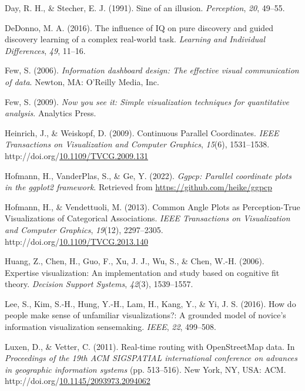 \documentclass[print]{nuthesis}
\newlength{\cslhangindent}
\newenvironment{CSLReferences}[2]%
{\setlength{\parindent}{0pt}%
\everypar{\setlength{\hangindent}{\cslhangindent}}\ignorespaces}%
{\par}
\begin{document}
\begin{CSLReferences}{1}{0}
\leavevmode{}%
Day, R. H., \& Stecher, E. J. (1991). Sine of an illusion. \emph{Perception}, \emph{20}, 49--55.

\leavevmode{}%
DeDonno, M. A. (2016). The influence of IQ on pure discovery and guided discovery learning of a complex real-world task. \emph{Learning and Individual Differences}, \emph{49}, 11--16.

\leavevmode{}%
Few, S. (2006). \emph{Information dashboard design: The effective visual communication of data}. Newton, MA: O'Reilly Media, Inc.

\leavevmode{}%
Few, S. (2009). \emph{Now you see it: Simple visualization techniques for quantitative analysis}. Analytics Press.

\leavevmode{}%
Heinrich, J., \& Weiskopf, D. (2009). {Continuous Parallel Coordinates}. \emph{IEEE Transactions on Visualization and Computer Graphics}, \emph{15}(6), 1531--1538. http://doi.org/\href{https://doi.org/10.1109/TVCG.2009.131}{10.1109/TVCG.2009.131}

\leavevmode{}%
Hofmann, H., VanderPlas, S., \& Ge, Y. (2022). \emph{Ggpcp: Parallel coordinate plots in the ggplot2 framework}. Retrieved from \url{https://github.com/heike/ggpcp}

\leavevmode{}%
Hofmann, H., \& Vendettuoli, M. (2013). {Common Angle Plots as Perception-True Visualizations of Categorical Associations}. \emph{IEEE Transactions on Visualization and Computer Graphics}, \emph{19}(12), 2297--2305. http://doi.org/\href{https://doi.org/10.1109/TVCG.2013.140}{10.1109/TVCG.2013.140}

\leavevmode{}%
Huang, Z., Chen, H., Guo, F., Xu, J. J., Wu, S., \& Chen, W.-H. (2006). Expertise visualization: An implementation and study based on cognitive fit theory. \emph{Decision Support Systems}, \emph{42}(3), 1539--1557.

\leavevmode{}%
Lee, S., Kim, S.-H., Hung, Y.-H., Lam, H., Kang, Y., \& Yi, J. S. (2016). How do people make sense of unfamiliar visualizations?: A grounded model of novice's information visualization sensemaking. \emph{IEEE}, \emph{22}, 499--508.

\leavevmode{}%
Luxen, D., \& Vetter, C. (2011). Real-time routing with OpenStreetMap data. In \emph{Proceedings of the 19th ACM SIGSPATIAL international conference on advances in geographic information systems} (pp. 513--516). New York, NY, USA: ACM. http://doi.org/\href{https://doi.org/10.1145/2093973.2094062}{10.1145/2093973.2094062}


\end{CSLReferences}
\end{document}

